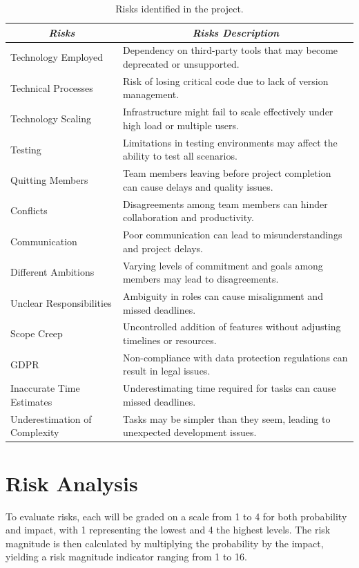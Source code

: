 \documentclass{article}
\begin{document}
\begin{table}[h]
\centering
\begin{tabularx}{\linewidth}{|l|X|}
\hline
\multicolumn{1}{|c|}{\textit{\textbf{Risks}}} & \multicolumn{1}{c|}{\textit{\textbf{Risks Description}}}                                                   \tabularnewline \hline
 Technology Employed & Dependency on third-party tools that may become deprecated or unsupported.\tabularnewline \hline
 Technical Processes & Risk of losing critical code due to lack of version management.\tabularnewline \hline
 Technology Scaling & Infrastructure might fail to scale effectively under high load or multiple users.\tabularnewline \hline
 Testing & Limitations in testing environments may affect the ability to test all scenarios.\tabularnewline \hline
 Quitting Members & Team members leaving before project completion can cause delays and quality issues.\tabularnewline \hline
 Conflicts & Disagreements among team members can hinder collaboration and productivity.\tabularnewline \hline
 Communication & Poor communication can lead to misunderstandings and project delays.\tabularnewline \hline
 Different Ambitions & Varying levels of commitment and goals among members may lead to disagreements.\tabularnewline \hline
 Unclear Responsibilities & Ambiguity in roles can cause misalignment and missed deadlines.\tabularnewline \hline
 Scope Creep & Uncontrolled addition of features without adjusting timelines or resources.\tabularnewline \hline
 GDPR & Non-compliance with data protection regulations can result in legal issues.\tabularnewline \hline
 Inaccurate Time Estimates & Underestimating time required for tasks can cause missed deadlines.\tabularnewline \hline
 Underestimation of Complexity & Tasks may be simpler than they seem, leading to unexpected development issues.\tabularnewline \hline

\end{tabularx}
\caption{Risks identified in the project.}
\label{table:risks}   
\end{table}
\pagebreak

\section{Risk Analysis}

To evaluate risks, each will be graded on a scale from 1 to 4 for both probability and impact, with 1 representing the lowest and 4 the highest levels. The risk magnitude is then calculated by multiplying the probability by the impact, yielding a risk magnitude indicator ranging from 1 to 16.
\end{document}
